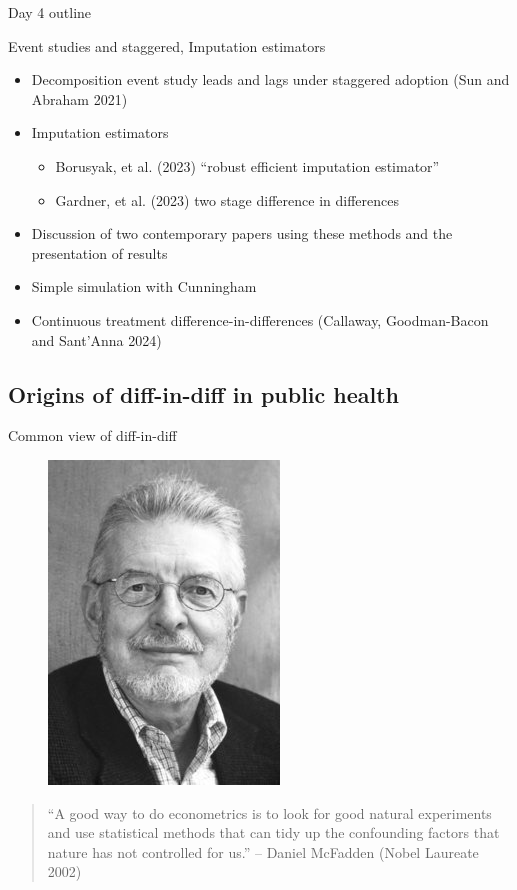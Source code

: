 \documentclass{beamer}
\begin{document}
\begin{frame}{Day 4 outline}

Event studies and staggered, Imputation estimators

\begin{itemize}
\item Decomposition event study leads and lags under staggered adoption (Sun and Abraham 2021)
\item Imputation estimators
		\begin{itemize}
		\item Borusyak, et al. (2023) “robust efficient imputation estimator”
		\item Gardner, et al. (2023) two stage difference in differences
		\end{itemize}
\item Discussion of two contemporary papers using these methods and the presentation of results
\item Simple simulation with Cunningham
\item Continuous treatment difference-in-differences (Callaway, Goodman-Bacon and Sant'Anna 2024)
\end{itemize}

\end{frame}




\subsection{Origins of diff-in-diff in public health}



\begin{frame}{Common view of diff-in-diff}

\begin{figure}
\includegraphics[scale=1.5]{./lecture_includes/mcfadden.jpg}
\end{figure}

\begin{quote}
``A good way to do econometrics is to look for good natural experiments and use statistical methods that can tidy up the confounding factors that nature has not controlled for us.'' -- Daniel McFadden (Nobel Laureate 2002)
\end{quote}


\end{frame}
\end{document}

